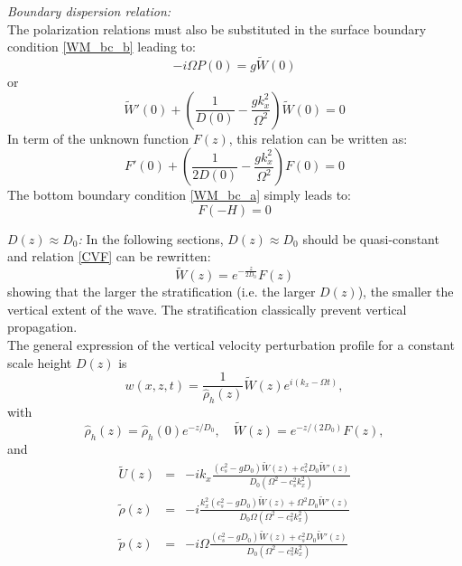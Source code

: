 \documentclass[a4paper,11pt]{article}
\begin{document}
\textit{Boundary dispersion relation:}\\
The polarization relations must also be substituted in the surface boundary condition \ref{WM_bc_b} leading to:
\begin{equation}
  \displaystyle
  -i\Omega P(0)=g \widetilde{W}(0)
\end{equation}
or
\begin{equation}
  \displaystyle
  \widetilde{W}'(0)+\left(
  \frac{1}{D(0)}-\frac{gk_x^2}{\Omega^2}
  \right)\widetilde{W}(0)=0
\end{equation}
In term of the unknown function $F(z)$, this relation can be written as:
\begin{equation}
  \displaystyle
  F'(0)+\left(
  \frac{1}{2D(0)}-\frac{gk_x^2}{\Omega^2}
  \right)F(0)=0
  \label{eqFbc}
\end{equation}
The bottom boundary condition \ref{WM_bc_a} simply leads to:
\begin{equation}
  \displaystyle
  F(-H)=0
  \label{eqFbc2}
\end{equation}

\textit{$D(z)\approx D_0$:}
In the following sections, $D(z)\approx D_0$ should be quasi-constant and relation \ref{CVF} can be rewritten:
\begin{equation}
  \displaystyle
  \widetilde{W}(z)=e^{-\frac{z}{2D_0}}F(z)
  \label{CVF2}
\end{equation}
showing that the larger the stratification (i.e. the larger $D(z)$), the smaller the vertical extent of the wave. The stratification classically prevent vertical propagation.\\
The general expression of the vertical velocity perturbation profile for a constant scale height $D(z)$ is
\begin{equation}
  \displaystyle
  w(x,z,t)=\frac{1}{\hat{\rho}_h(z)}\widetilde{W}(z)e^{i(k_x-\Omega t)},
\end{equation}
with 
\begin{equation}
  \displaystyle
  \hat{\rho}_h(z)=\hat{\rho}_h(0)e^{-z/D_0},\quad \widetilde{W}(z)=e^{-z/(2D_0)}F(z),
\end{equation}
and
\begin{equation}
  \displaystyle
  \begin{array}{rcl}
    \widetilde{U}(z)&=&\displaystyle  -ik_x\frac{(c_s^2-gD_0)\widetilde{W}(z)+c_s^2D_0\widetilde{W}'(z)}{D_0(\Omega^2-c_s^2k_x^2)}\\[4mm]
    \widetilde{\rho}(z)&=&\displaystyle -i\frac{k_x^2(c_s^2-gD_0)\widetilde{W}(z)+\Omega^2D_0\widetilde{W}'(z)}{D_0\Omega(\Omega^2-c_s^2k_x^2)}\\[4mm]
    \widetilde{p}(z)&=&\displaystyle -i\Omega\frac{(c_s^2-gD_0)\widetilde{W}(z)+c_s^2D_0\widetilde{W}'(z)}{D_0(\Omega^2-c_s^2k_x^2)}
\end{array}
\end{equation}
\end{document}
